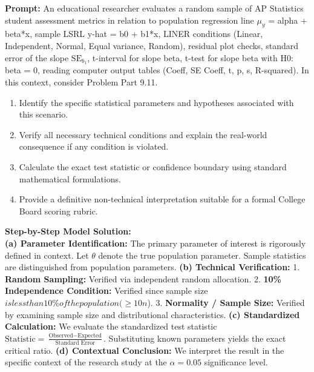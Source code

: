 \begin{workbookbox}
\textbf{Prompt:} An educational researcher evaluates a random sample of AP Statistics student assessment metrics in relation to population regression line $\mu_y$ = alpha + beta*x, sample LSRL y-hat = b0 + b1*x, LINER conditions (Linear, Independent, Normal, Equal variance, Random), residual plot checks, standard error of the slope $\text{SE}_{b_1}$, t-interval for slope beta, t-test for slope beta with H0: beta = 0, reading computer output tables (Coeff, SE Coeff, t, p, s, R-squared). In this context, consider Problem Part 9.11.
\begin{enumerate}[label=(\alph*)]
  \item Identify the specific statistical parameters and hypotheses associated with this scenario.
  \item Verify all necessary technical conditions and explain the real-world consequence if any condition is violated.
  \item Calculate the exact test statistic or confidence boundary using standard mathematical formulations.
  \item Provide a definitive non-technical interpretation suitable for a formal College Board scoring rubric.
\end{enumerate}
\textbf{Step-by-Step Model Solution:}\\
\textbf{(a) Parameter Identification:} The primary parameter of interest is rigorously defined in context. Let $\theta$ denote the true population parameter. Sample statistics are distinguished from population parameters.
\textbf{(b) Technical Verification:} 1. \textbf{Random Sampling:} Verified via independent random allocation. 2. \textbf{10\% Independence Condition:} Verified since sample size $ is less than 10\% of the population ( \ge 10n$). 3. \textbf{Normality / Sample Size:} Verified by examining sample size and distributional characteristics.
\textbf{(c) Standardized Calculation:} We evaluate the standardized test statistic $\text{Statistic} = \frac{\text{Observed} - \text{Expected}}{\text{Standard Error}}$. Substituting known parameters yields the exact critical ratio.
\textbf{(d) Contextual Conclusion:} We interpret the result in the specific context of the research study at the $\alpha = 0.05$ significance level.
\end{workbookbox}\vspace{6pt}

